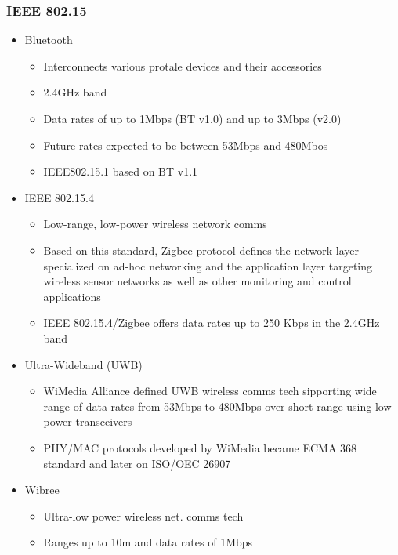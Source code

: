 \subsubsection{IEEE 802.15}
\begin{itemize}
	\item Bluetooth
	\begin{itemize}
		\item Interconnects various protale devices and their
			accessories
		\item 2.4GHz band
		\item Data rates of up to 1Mbps (BT v1.0) and up to 3Mbps (v2.0)
		\item Future rates expected to be between 53Mbps and 480Mbos
		\item IEEE802.15.1 based on BT v1.1
	\end{itemize}
	\item IEEE 802.15.4
	\begin{itemize}
		\item Low-range, low-power wireless network comms
		\item Based on this standard, Zigbee protocol defines the
			network layer specialized on ad-hoc networking and the
			application layer targeting wireless sensor networks as
			well as other monitoring and control applications
		\item IEEE 802.15.4/Zigbee offers data rates up to 250 Kbps in
			the 2.4GHz band
	\end{itemize}
	\item Ultra-Wideband (UWB)
	\begin{itemize}
		\item WiMedia Alliance defined UWB wireless comms tech
			sipporting wide range of data rates from 53Mbps to
			480Mbps over short range using low power transceivers
		\item PHY/MAC protocols developed by WiMedia became ECMA 368
			standard and later on ISO/OEC 26907
	\end{itemize}
	\item Wibree
	\begin{itemize}
		\item Ultra-low power wireless net. comms tech
		\item Ranges up to 10m and data rates of 1Mbps
	\end{itemize}
\end{itemize}
